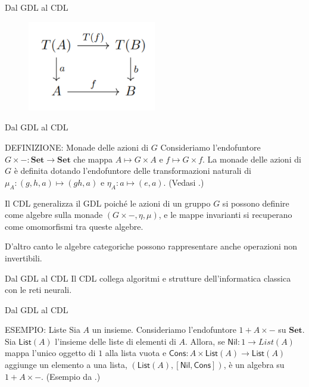 \documentclass{beamer}
\begin{document}
\begin{frame}{Dal GDL al CDL}
    \begin{figure}
        \begin{center}
            \includegraphics[width=0.5\textwidth]{figures/algebra_hom.png}
            \caption*{}
        \end{center}
    \end{figure}
\end{frame}

\begin{frame}{Dal GDL al CDL}
    \begin{block}{DEFINIZIONE: Monade delle azioni di $G$}
        Consideriamo l'endofuntore $G \times -: \mathbf{Set} \to \mathbf{Set}$ che mappa $A \mapsto G \times A$ e $f \mapsto G \times f$.
        La monade delle azioni di $G$ è definita dotando l'endofuntore delle transformazioni naturali di $\mu_A: (g,h,a) \mapsto (gh,a)$ e  $\eta_A: a \mapsto (e,a)$. (Vedasi \cite{gavranovicposition}.)
    \end{block}
\end{frame}

\begin{frame}
    Il CDL generalizza il GDL poiché le azioni di un gruppo $G$ si possono definire come algebre sulla monade $(G \times -, \eta, \mu)$, e le mappe invarianti si recuperano come omomorfismi tra queste algebre.

    D'altro canto le algebre categoriche possono rappresentare anche operazioni non invertibili.
\end{frame}

\begin{frame}{Dal GDL al CDL}
    Il CDL collega algoritmi e strutture dell'informatica classica con le reti neurali.
\end{frame}

\begin{frame}{Dal GDL al CDL}
    \begin{block}{ESEMPIO: Liste}
        Sia $A$ un insieme. Consideriamo l'endofuntore $1 + A \times -$ su $\mathbf{Set}$. Sia $\mathsf{List}(A)$ l'insieme delle liste di elementi di $A$. Allora, se $\mathsf{Nil}: 1 \to {List}(A)$ mappa l'unico oggetto di $1$ alla lista vuota e $\mathsf{Cons}: A \times \mathsf{List}(A) \to \mathsf{List}(A)$ aggiunge un elemento a una lista, $(\mathsf{List}(A), [\mathsf{Nil}, \mathsf{Cons}])$, è un algebra su $1 + A \times -$. (Esempio da \cite{gavranovicposition}.)
    \end{block}
\end{frame}
\end{document}
